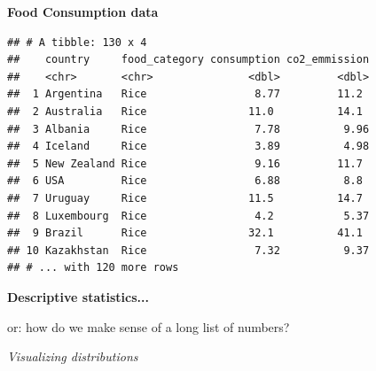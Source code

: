 \documentclass[ignorenonframetext,]{beamer}
\newenvironment{Shaded}{\begin{snugshade}}{\end{snugshade}}
\newcommand{\KeywordTok}[1]{\textcolor[rgb]{0.13,0.29,0.53}{\textbf{#1}}}
\newcommand{\NormalTok}[1]{#1}
\newcommand{\OperatorTok}[1]{\textcolor[rgb]{0.81,0.36,0.00}{\textbf{#1}}}
\newcommand{\StringTok}[1]{\textcolor[rgb]{0.31,0.60,0.02}{#1}}
\begin{document}
\begin{frame}[fragile]{}
\protect\hypertarget{section-8}{}

\textbf{\large Food Consumption data}

\vspace{1ex}\scriptsize

\begin{Shaded}
\end{Shaded}

\begin{verbatim}
## # A tibble: 130 x 4
##    country     food_category consumption co2_emmission
##    <chr>       <chr>               <dbl>         <dbl>
##  1 Argentina   Rice                 8.77         11.2 
##  2 Australia   Rice                11.0          14.1 
##  3 Albania     Rice                 7.78          9.96
##  4 Iceland     Rice                 3.89          4.98
##  5 New Zealand Rice                 9.16         11.7 
##  6 USA         Rice                 6.88          8.8 
##  7 Uruguay     Rice                11.5          14.7 
##  8 Luxembourg  Rice                 4.2           5.37
##  9 Brazil      Rice                32.1          41.1 
## 10 Kazakhstan  Rice                 7.32          9.37
## # ... with 120 more rows
\end{verbatim}

\end{frame}

\begin{frame}{}
\protect\hypertarget{section-9}{}

\textbf{\large Descriptive statistics...}

\vspace{2ex}

or: how do we make sense of a long list of numbers?

\end{frame}

\begin{frame}[standout]{}
\protect\hypertarget{section-10}{}

\begin{center}
        
    \vspace{2.3em}
    \color{white}\textit{\Huge\gar Visualizing distributions}
\end{center}

\end{frame}
\end{document}
